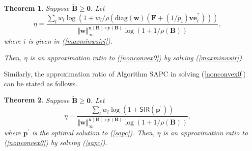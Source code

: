 \documentclass[10pt,twocolumn]{IEEEtran}
\newcommand{\0}{\mathbf{0}}
\newcommand{\1}{\mathbf{1}}
\newcommand{\trans}{^\top}
\newtheorem{theorem}{Theorem}
\begin{document}
\begin{theorem}
\label{maxminwsirapproxratio}
Suppose $\mathbf{\tilde{B}} \ge \mathbf{0}$. Let
\begin{equation}
\eta = \frac{\sum_l w_l \log(1+w_l/\rho(\mbox{diag}(\mathbf{w})(\mathbf{F}+(1/\bar{p}_i)\mathbf{v}\mathbf{e}_i^{\trans})))}{\Vert \mathbf{w} \Vert^{\mathbf{x}(\mathbf{B}) \circ \mathbf{y}(\mathbf{B})}_{\infty} \log(1+1/\rho(\mathbf{B}))},
\end{equation}
where $i$ is given in (\ref{maxminwsiri}).

Then, $\eta$ is an approximation ratio to (\ref{nonconvex0}) by solving (\ref{maxminwsir}).
\end{theorem}

Similarly, the approximation ratio of Algorithm SAPC in solving (\ref{nonconvex0}) can be stated as follows. 
\begin{theorem}
\label{sapcapproxratio}
Suppose $\mathbf{\tilde{B}} \ge \mathbf{0}$. Let
\begin{equation}
\eta = \frac{\sum_l w_l \log(1+\mathsf{SIR}(\mathbf{p}^{\prime}))}{\Vert \mathbf{w} \Vert^{\mathbf{x}(\mathbf{B}) \circ \mathbf{y}(\mathbf{B})}_{\infty} \log(1+1/\rho(\mathbf{B}))},
\end{equation}
where $\mathbf{p}^{\prime}$ is the optimal solution to (\ref{sapc}). Then, $\eta$ is an approximation ratio to (\ref{nonconvex0}) by solving (\ref{sapc}).
\end{theorem}
\end{document}
